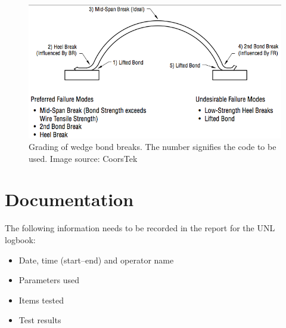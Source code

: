 \documentclass[10pt]{unlsilabsop}
\begin{document}
\begin{figure}[h]
    \begin{center}
        \includegraphics[width=12cm]{img/GradingWedgeBondBreaks.png}
        \caption{Grading of wedge bond breaks. The number signifies the code to be used. Image source: CoorsTek}
        \label{fig:grading}
    \end{center}
\end{figure}

\section{Documentation}
The following information needs to be recorded in the report for the UNL logbook:
\begin{itemize}
\item Date, time (start--end) and operator name
\item Parameters used
\item Items tested
\item Test results
\end{itemize}
\end{document}
